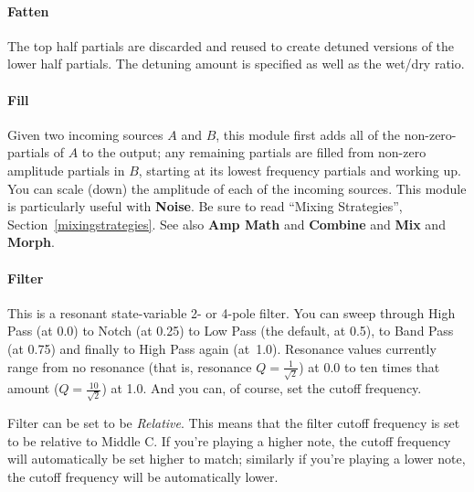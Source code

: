 \documentclass{article}
\begin{document}
\paragraph{Fatten}  The top half partials are discarded and reused to create detuned versions of the lower half partials.  The detuning amount is specified as well as the wet/dry ratio.

\paragraph{Fill}  Given two incoming sources \(A\) and \(B\), this module first adds all of the non-zero-partials of \(A\) to the output; any remaining partials are filled from non-zero amplitude partials in \(B\), starting at its lowest frequency partials and working up.  You can scale (down) the amplitude of each of the incoming sources.  This module is particularly useful with {\bf Noise}.  Be sure to read ``Mixing Strategies'', Section~\ref{mixingstrategies}.  See also {\bf Amp Math} and {\bf Combine} and {\bf Mix} and {\bf Morph}.

\paragraph{Filter}  This is a resonant state-variable 2- or 4-pole filter. You can sweep through High Pass (at 0.0) to Notch (at 0.25) to Low Pass (the default, at 0.5), to Band Pass (at 0.75) and finally to High Pass again (at~1.0).  Resonance values currently range from no resonance (that is, resonance \(Q=\frac{1}{\sqrt{2}}\)) at 0.0 to ten times that amount (\(Q =\frac{10}{\sqrt{2}}\))  at 1.0.  And you can, of course, set the cutoff frequency.

Filter can be set to be {\it Relative}.  This means that the filter cutoff frequency is set to be relative to Middle C.  If you're playing a higher note, the cutoff frequency will automatically be set higher to match; similarly if you're playing a lower note, the cutoff frequency will be automatically lower.

\end{document}
